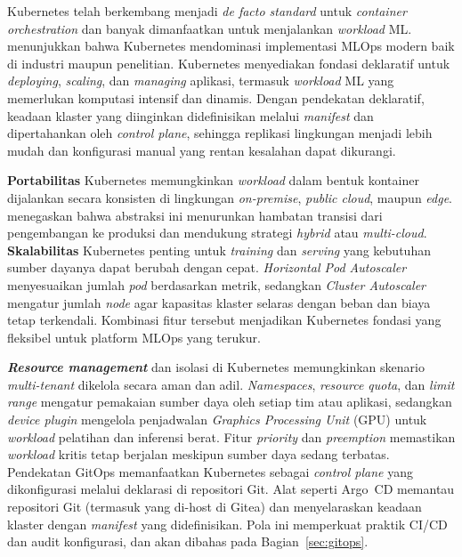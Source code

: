 Kubernetes telah berkembang menjadi \textit{de facto standard} untuk \textit{container orchestration} \autocite{lakka2025kubernetes} dan banyak dimanfaatkan untuk menjalankan \textit{workload} ML. \textcite{kreuzberger2023mlops} menunjukkan bahwa Kubernetes mendominasi implementasi MLOps modern baik di industri maupun penelitian. Kubernetes menyediakan fondasi deklaratif untuk \textit{deploying}, \textit{scaling}, dan \textit{managing} aplikasi, termasuk \textit{workload} ML yang memerlukan komputasi intensif dan dinamis. Dengan pendekatan deklaratif, keadaan klaster yang diinginkan didefinisikan melalui \textit{manifest} dan dipertahankan oleh \textit{control plane}, sehingga replikasi lingkungan menjadi lebih mudah dan konfigurasi manual yang rentan kesalahan dapat dikurangi.

\textbf{Portabilitas} Kubernetes memungkinkan \textit{workload} dalam bentuk kontainer dijalankan secara konsisten di lingkungan \textit{on-premise}, \textit{public cloud}, maupun \textit{edge}. \textcite{adusumilli2025serverless} menegaskan bahwa abstraksi ini menurunkan hambatan transisi dari pengembangan ke produksi dan mendukung strategi \textit{hybrid} atau \textit{multi-cloud}. \textbf{Skalabilitas} Kubernetes penting untuk \textit{training} dan \textit{serving} yang kebutuhan sumber dayanya dapat berubah dengan cepat. \textit{Horizontal Pod Autoscaler} menyesuaikan jumlah \textit{pod} berdasarkan metrik, sedangkan \textit{Cluster Autoscaler} mengatur jumlah \textit{node} agar kapasitas klaster selaras dengan beban dan biaya tetap terkendali. Kombinasi fitur tersebut menjadikan Kubernetes fondasi yang fleksibel untuk platform MLOps yang terukur.

\textbf{\textit{Resource management}} dan isolasi di Kubernetes memungkinkan skenario \textit{multi-tenant} dikelola secara aman dan adil. \textit{Namespaces}, \textit{resource quota}, dan \textit{limit range} mengatur pemakaian sumber daya oleh setiap tim atau aplikasi, sedangkan \textit{device plugin} mengelola penjadwalan \textit{Graphics Processing Unit} (GPU) untuk \textit{workload} pelatihan dan inferensi berat. Fitur \textit{priority} dan \textit{preemption} memastikan \textit{workload} kritis tetap berjalan meskipun sumber daya sedang terbatas. Pendekatan GitOps memanfaatkan Kubernetes sebagai \textit{control plane} yang dikonfigurasi melalui deklarasi di repositori Git. Alat seperti Argo~CD memantau repositori Git (termasuk yang di-host di Gitea) dan menyelaraskan keadaan klaster dengan \textit{manifest} yang didefinisikan. Pola ini memperkuat praktik CI/CD dan audit konfigurasi, dan akan dibahas pada Bagian~\ref{sec:gitops}.

